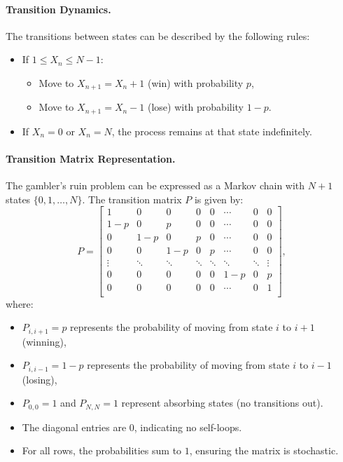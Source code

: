 \paragraph{Transition Dynamics.}
The transitions between states can be described by the following rules:
\begin{itemize}
    \item If \( 1 \leq X_n \leq N-1 \):
    \begin{itemize}
        \item Move to \( X_{n+1} = X_n + 1 \) (win) with probability \( p \),
        \item Move to \( X_{n+1} = X_n - 1 \) (lose) with probability \( 1-p \).
    \end{itemize}
    \item If \( X_n = 0 \) or \( X_n = N \), the process remains at that state indefinitely.
\end{itemize}

\paragraph{Transition Matrix Representation.}
The gambler’s ruin problem can be expressed as a Markov chain with \( N+1 \) states \( \{0, 1, \dots, N\} \). The transition matrix \( P \) is given by:
\[
P =
\begin{bmatrix}
1       & 0         & 0      & 0     & 0       & \cdots & 0        & 0      \\
1-p     & 0         & p      & 0     & 0       & \cdots & 0        & 0      \\
0       & 1-p       & 0      & p     & 0       & \cdots & 0        & 0      \\
0       & 0         & 1-p    & 0     & p       & \cdots & 0        & 0      \\
\vdots  & \ddots    & \ddots &\ddots & \ddots  & \ddots & \ddots   & \vdots \\
0       & 0         & 0      & 0     & 0       & 1-p    & 0        & p      \\
0       & 0         & 0      & 0     & 0       & \cdots & 0        & 1      \\
\end{bmatrix},
\]
where:
\begin{itemize}
    \item \( P_{i,i+1} = p \) represents the probability of moving from state \( i \) to \( i+1 \) (winning),
    \item \( P_{i,i-1} = 1-p \) represents the probability of moving from state \( i \) to \( i-1 \) (losing),
    \item \( P_{0,0} = 1 \) and \( P_{N,N} = 1 \) represent absorbing states (no transitions out).
    \item The diagonal entries are \( 0 \), indicating no self-loops.
    \item For all rows, the probabilities sum to \( 1 \), ensuring the matrix is stochastic.
\end{itemize}

